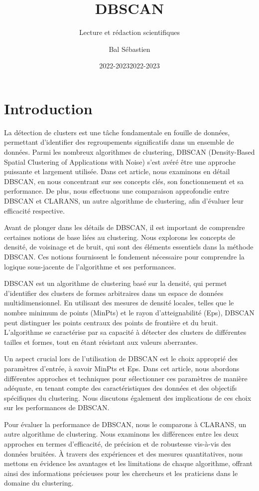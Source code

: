 \documentclass[
  oneside]{memoire-umons}
\title{DBSCAN}
\subtitle{Lecture et rédaction scientifiques}
\author{Bal Sébastien}
\date{2022-2023}
\date{2022-2023}
\begin{document}
\maketitle

{
\setcounter{tocdepth}{3}
\tableofcontents
}
\chapter{Introduction}

La détection de clusters est une tâche fondamentale en fouille de
données, permettant d'identifier des regroupements significatifs dans un
ensemble de données. Parmi les nombreux algorithmes de clustering,
DBSCAN (Density-Based Spatial Clustering of Applications with Noise)
s'est avéré être une approche puissante et largement utilisée. Dans cet
article, nous examinons en détail DBSCAN, en nous concentrant sur ses
concepts clés, son fonctionnement et sa performance. De plus, nous
effectuons une comparaison approfondie entre DBSCAN et CLARANS, un autre
algorithme de clustering, afin d'évaluer leur efficacité respective.

Avant de plonger dans les détails de DBSCAN, il est important de
comprendre certaines notions de base liées au clustering. Nous explorons
les concepts de densité, de voisinage et de bruit, qui sont des éléments
essentiels dans la méthode DBSCAN. Ces notions fournissent le fondement
nécessaire pour comprendre la logique sous-jacente de l'algorithme et
ses performances.

DBSCAN est un algorithme de clustering basé sur la densité, qui permet
d'identifier des clusters de formes arbitraires dans un espace de
données multidimensionnel. En utilisant des mesures de densité locales,
telles que le nombre minimum de points (MinPts) et le rayon
d'atteignabilité (Eps), DBSCAN peut distinguer les points centraux des
points de frontière et du bruit. L'algorithme se caractérise par sa
capacité à détecter des clusters de différentes tailles et formes, tout
en étant résistant aux valeurs aberrantes.

Un aspect crucial lors de l'utilisation de DBSCAN est le choix approprié
des paramètres d'entrée, à savoir MinPts et Eps. Dans cet article, nous
abordons différentes approches et techniques pour sélectionner ces
paramètres de manière adéquate, en tenant compte des caractéristiques
des données et des objectifs spécifiques du clustering. Nous discutons
également des implications de ces choix sur les performances de DBSCAN.

Pour évaluer la performance de DBSCAN, nous le comparons à CLARANS, un
autre algorithme de clustering. Nous examinons les différences entre les
deux approches en termes d'efficacité, de précision et de robustesse
vis-à-vis des données bruitées. À travers des expériences et des mesures
quantitatives, nous mettons en évidence les avantages et les limitations
de chaque algorithme, offrant ainsi des informations précieuses pour les
chercheurs et les praticiens dans le domaine du clustering.
\end{document}

